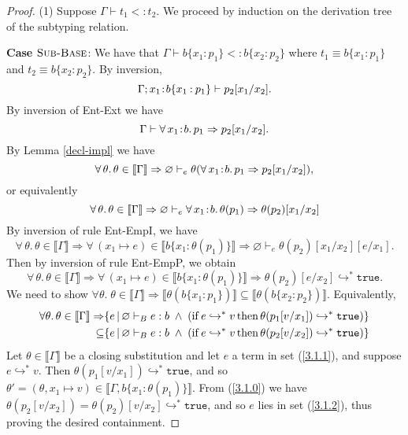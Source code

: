 \documentclass[11pt]{article}
\newcommand{\bind}{\hspace{0.1em}{:}\hspace{0.1em}} %
\newcommand{\col}{\mathbin{:}}       %
\newcommand{\lb}{\llbracket}         %
\newcommand{\rb}{\rrbracket}         %
\newcommand{\many}{\hookrightarrow^*}
\newcommand{\true}{\mathtt{true}}
\begin{document}
\begin{proof}
(1) Suppose $\Gamma \vdash t_1 <: t_2$. We proceed by induction on the derivation tree of the subtyping relation.

{\bf Case} $\textsc{Sub-Base}$: We have that 
$\Gamma \vdash b\{x_1\col p_1\} <: b\{x_2\col p_2\}$ where $t_1 \equiv b\{x_1\col p_1\}$ and $t_2 \equiv b\{x_2\col p_2\}$.
By inversion, 
\[\Gamma; x_1\bind b\{x_1\col p_1\} \vdash p_2[x_1/x_2].\] 
By inversion of {\sc Ent-Ext} we have 
\begin{equation}\Gamma \vdash \forall\, x_1\bind b.\, p_1 \Rightarrow p_2[x_1/x_2]
.\end{equation}
By Lemma \ref{decl-impl} we have
\[
\forall\,\theta.\,\theta\in\lb\Gamma\rb \Rightarrow 
\varnothing \vdash_e \theta(\forall\, x_1\bind b.\, p_1 \Rightarrow p_2[x_1/x_2])
,\]
or equivalently
\begin{equation}
\forall\,\theta.\,\theta\in\lb\Gamma\rb \Rightarrow 
\varnothing \vdash_e \forall\, x_1\bind b.\, \theta(p_1) \Rightarrow \theta(p_2)[x_1/x_2]
\end{equation}
By inversion of rule {\sc Ent-EmpI}, we have
\begin{equation}
\forall\,\theta.\,\theta\in\lb\Gamma\rb \Rightarrow 
\forall\, (x_1\mapsto e)\in \lb b\{x_1\col \theta(p_1)\}\rb \Rightarrow \varnothing \vdash_e \theta(p_2)[x_1/x_2][e/x_1].
\end{equation}
Then by inversion of rule {\sc Ent-EmpP}, we obtain
\begin{equation}\label{3.1.0}
\forall\,\theta.\,\theta\in\lb\Gamma\rb \Rightarrow 
\forall\, (x_1\mapsto e)\in \lb b\{x_1\col \theta(p_1)\}\rb \Rightarrow \theta(p_2)[e/x_2] \many \true.
\end{equation}
We need to show $\forall \theta.\; 
\theta \in \lb \Gamma \rb \Rightarrow 
\lb\theta(b\{x_1:p_1\})\rb \subseteq \lb\theta(b\{x_2:p_2\})\rb.$
Equivalently,
\begin{align}\label{3.1.1}
\forall\theta.\,\theta\in\lb\Gamma\rb \Rightarrow&
\{ e \,|\, \varnothing \vdash_B e:b \;\wedge\; 
  ({\rm if}\, e \many v \,{\rm then}\, \theta(p_1[v/x_1]) \many \true)\}\\
\subseteq &\{ e \,|\, \varnothing \vdash_B e:b \;\wedge\; 
  ({\rm if}\, e \many v \,{\rm then}\, \theta(p_2[v/x_2]) \many \true)\}\label{3.1.2}
\end{align}
Let $\theta \in \lb\Gamma\rb$ be a closing substitution and
let $e$ a term in set (\ref{3.1.1}), and suppose $e \many v$. Then $\theta(p_1[v/x_1]) \many \true$, and so $\theta' = (\theta, x_1 \mapsto v) \in \lb\Gamma, b\{ x_1\col \theta(p_1)\}\rb$.
From (\ref{3.1.0}) we have
$\theta(p_2[v/x_2]) = \theta(p_2)[v/x_2] \many \true$,
and so $e$ lies in set (\ref{3.1.2}), thus proving the desired containment.


\end{proof}
\end{document}

